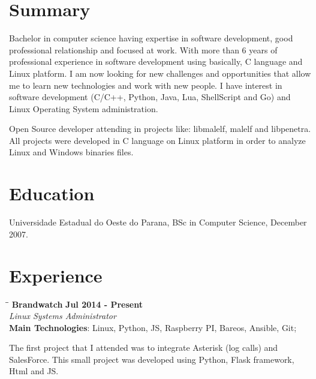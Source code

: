 \documentclass[margin]{res}
\begin{document}
  

\address{Brighton, UK \\ benatto@gmail.com \\ Phone: +44 07405110040 \\ Post Code: SW16 2BU }
                           
                        
\begin{resume}                        
 
\section{Summary}       Bachelor in computer science having expertise in software development, good professional   
                        relationship and focused at work. With more than 6 years of professional experience in software development using basically, C language and Linux platform. I am now looking for new challenges and opportunities that allow me to learn new technologies and work with new people. I have interest in software development (C/C++, Python, Java, Lua, ShellScript and Go) and Linux Operating System administration.
                        
                        Open Source developer attending in projects like: libmalelf, malelf and libpenetra. All projects were developed in C language on Linux platform in order to analyze Linux and Windows binaries files.
 
\section{Education}	Universidade Estadual do Oeste do Parana, BSc in Computer Science, December 2007.
  
\section{Experience}

\vspace{-0.1in}
   \begin{tabbing}
   \hspace{2.3in}\= \hspace{1.7in}\= \kill %
    \textbf{Brandwatch}    \>\>\textbf{Jul 2014 - Present}\\
    \textit{Linux Systems Administrator}\\        
    \textbf{Main Technologies}: Linux, Python, JS, Raspberry PI, Bareos, Ansible, Git;
   \end{tabbing}\vspace{-20pt}      %
    \vspace{2mm}
The first project that I attended was to integrate Asterisk (log calls) and SalesForce. This small project was developed using Python, Flask framework, Html and JS.


\end{resume}
\end{document}
